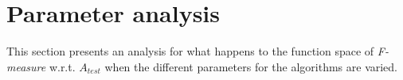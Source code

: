 

\section{Parameter analysis}\label{sec:parameters}

This section presents an analysis for what happens to the function space of \textit{F-measure} w.r.t. $A_{test}$ when the different parameters for the algorithms are varied.


\newpage


\newpage

